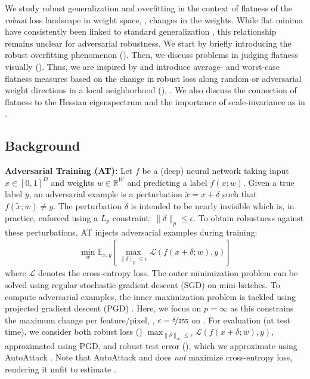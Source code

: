 We study robust generalization and overfitting in the context of flatness of the \emph{robust} loss landscape in weight space, \ie, \wrt changes in the weights. While flat minima have consistently been linked to standard generalization \cite{HochreiterNC1997,LiNIPS2018,NeyshaburNIPS2017,KeskarICLR2017}, this relationship remains unclear for adversarial robustness.
We start by briefly introducing the robust overfitting phenomenon (). Then, we discuss problems in judging flatness visually \cite{LiNIPS2018} (). Thus, we are inspired by \cite{KeskarICLR2017,NeyshaburNIPS2017} and introduce average- and worst-case flatness measures based on the change in robust loss along random or adversarial weight directions in a local neighborhood (), \cf {}.
We also discuss the connection of flatness to the Hessian eigenspectrum \cite{YaoNIPS2018} and the importance of scale-invariance as in \cite{DinhICML2017}.

\subsection{Background}
\label{subsec:main-overfitting}

\textbf{Adversarial Training (AT):}
%
Let $f$ be a (deep) neural network taking input $x \in [0,1]^D$ and weights $w \in \mathbb{R}^W$ and predicting a label $f(x;w)$. Given a true label $y$, an adversarial example is a perturbation $\tilde{x} = x + \delta$ such that $f(\tilde{x};w) \neq y$. The perturbation $\delta$ is intended to be nearly invisible which is, in practice, enforced using a $L_p$ constraint: $\|\delta\|_p \leq \epsilon$. To obtain robustness against these perturbations, AT injects adversarial examples during training:
\begin{align}
	\min_w \mathbb{E}_{x,y}\left[\max_{\|\delta\|_p \leq \epsilon} \mathcal{L}(f(x + \delta;w), y)\right]
\end{align}
where $\mathcal{L}$ denotes the cross-entropy loss. The outer minimization problem can be solved using regular stochastic gradient descent (SGD) on mini-batches. To compute adversarial examples, the inner maximization problem is tackled using projected gradient descent (PGD) \cite{MadryICLR2018}. Here, we focus on $p = \infty$ as this constrains the maximum change per feature/pixel, \eg, $\epsilon = \nicefrac{8}{255}$ on \CifarT. For evaluation (at test time), we consider both robust loss (\RCE) $\max_{\|\delta\|_\infty \leq \epsilon} \mathcal{L}(f(x + \delta;w), y)$, approximated using PGD, and robust test error (\RTE), which we approximate using AutoAttack \cite{CroceICML2020}. Note that AutoAttack  and does \emph{not} maximize cross-entropy loss, rendering it unfit to estimate \RCE.

